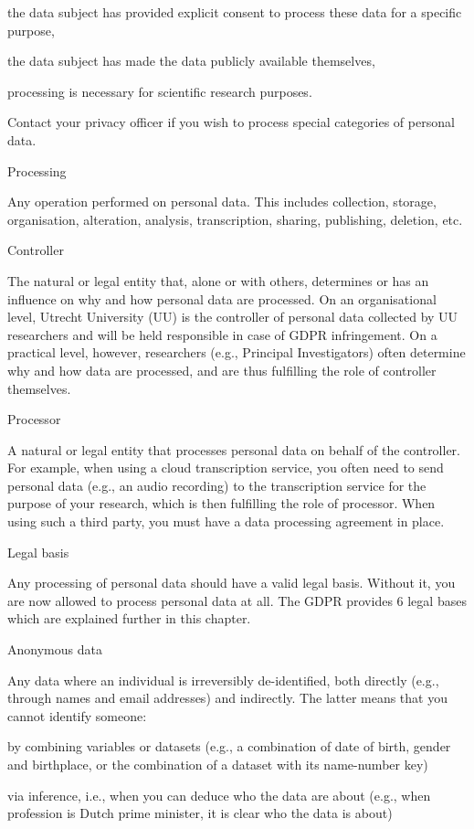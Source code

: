 \documentclass[
]{book}
\begin{document}
the data subject has provided explicit consent to process these data for
a specific purpose,

the data subject has made the data publicly available themselves,

processing is necessary for scientific research purposes.

Contact your privacy
officer if you wish to process special categories of personal data.

Processing

Any operation performed on personal data. This includes collection, storage,
organisation, alteration, analysis, transcription, sharing, publishing, deletion, etc.

Controller

The natural or legal entity that, alone or with others, determines or has an
influence on why and how personal data are processed. On an
organisational level, Utrecht University (UU) is the controller of personal
data collected by UU researchers and will be held responsible in case of GDPR
infringement. On a practical level, however, researchers (e.g., Principal
Investigators) often determine why and how data are processed, and are thus
fulfilling the role of controller themselves.

Processor

A natural or legal entity that processes personal data on behalf of the
controller. For example, when using a cloud transcription service, you often
need to send personal data (e.g., an audio recording) to the transcription
service for the purpose of your research, which is then fulfilling the role
of processor. When using such a third party, you must have a
data processing agreement in place.

Legal basis

Any processing of personal data should have a valid legal basis. Without it,
you are now allowed to process personal data at all. The GDPR provides 6 legal
bases which are explained further in this chapter.

Anonymous data

Any data where an individual is irreversibly de-identified, both directly
(e.g., through names and email addresses) and indirectly. The latter means
that you cannot identify someone:

by combining variables or datasets (e.g., a combination of date of birth,
gender and birthplace, or the combination of a dataset with its name-number key)

via inference, i.e., when you can deduce who the data are about (e.g.,
when profession is Dutch prime minister, it is clear who the data is about)
\end{document}
